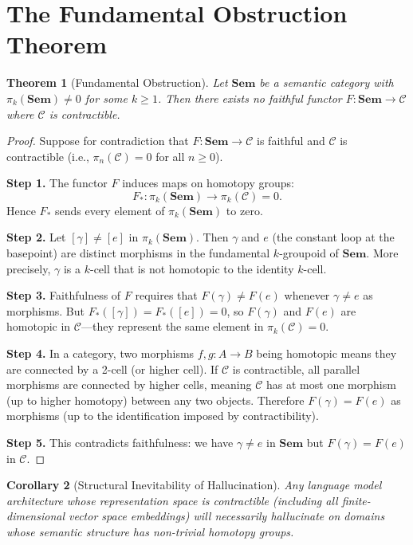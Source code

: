 \documentclass[11pt,a4paper]{article}
\theoremstyle{plain}
\newtheorem{theorem}{Theorem}[section]
\newtheorem{corollary}[theorem]{Corollary}
\theoremstyle{definition}
\theoremstyle{remark}
\newcommand{\Sem}{\mathbf{Sem}}
\begin{document}
\section{The Fundamental Obstruction Theorem}
\label{sec:obstruction}

\begin{theorem}[Fundamental Obstruction]
\label{thm:fundamental-obstruction}
Let $\Sem$ be a semantic category with $\pi_k(\Sem) \neq 0$ for some $k \geq 1$. Then there exists no faithful functor $F: \Sem \to \mathcal{C}$ where $\mathcal{C}$ is contractible.
\end{theorem}

\begin{proof}
Suppose for contradiction that $F: \Sem \to \mathcal{C}$ is faithful and $\mathcal{C}$ is contractible (i.e., $\pi_n(\mathcal{C}) = 0$ for all $n \geq 0$).

\textbf{Step 1.} The functor $F$ induces maps on homotopy groups:
\[
F_*: \pi_k(\Sem) \to \pi_k(\mathcal{C}) = 0.
\]
Hence $F_*$ sends every element of $\pi_k(\Sem)$ to zero.

\textbf{Step 2.} Let $[\gamma] \neq [e]$ in $\pi_k(\Sem)$. Then $\gamma$ and $e$ (the constant loop at the basepoint) are distinct morphisms in the fundamental $k$-groupoid of $\Sem$. More precisely, $\gamma$ is a $k$-cell that is not homotopic to the identity $k$-cell.

\textbf{Step 3.} Faithfulness of $F$ requires that $F(\gamma) \neq F(e)$ whenever $\gamma \neq e$ as morphisms. But $F_*([\gamma]) = F_*([e]) = 0$, so $F(\gamma)$ and $F(e)$ are homotopic in $\mathcal{C}$---they represent the same element in $\pi_k(\mathcal{C}) = 0$.

\textbf{Step 4.} In a category, two morphisms $f, g: A \to B$ being homotopic means they are connected by a 2-cell (or higher cell). If $\mathcal{C}$ is contractible, all parallel morphisms are connected by higher cells, meaning $\mathcal{C}$ has at most one morphism (up to higher homotopy) between any two objects. Therefore $F(\gamma) = F(e)$ as morphisms (up to the identification imposed by contractibility).

\textbf{Step 5.} This contradicts faithfulness: we have $\gamma \neq e$ in $\Sem$ but $F(\gamma) = F(e)$ in $\mathcal{C}$.
\end{proof}

\begin{corollary}[Structural Inevitability of Hallucination]
\label{cor:structural-inevitability}
Any language model architecture whose representation space is contractible (including all finite-dimensional vector space embeddings) will necessarily hallucinate on domains whose semantic structure has non-trivial homotopy groups.
\end{corollary}
\end{document}
